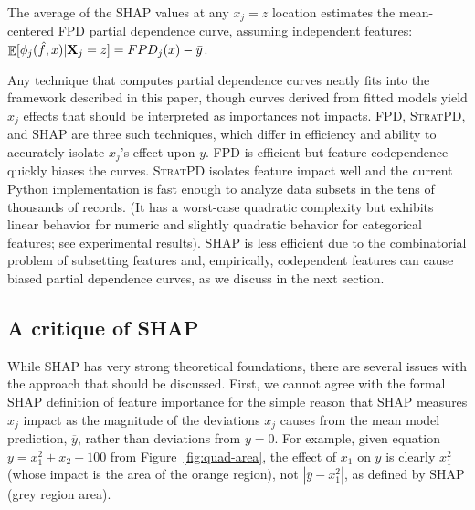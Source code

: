 \documentclass[11pt]{article}
\newcommand{\figref}[1]{Figure~\ref{#1}}
\DeclareMathOperator{\Ex}{\mathbb{E}}
\newcommand{\spd}{\fontfamily{cmr}\textsc{\small StratPD}}
\begin{document}
\begin{theorem}
The average of the SHAP values at any $x_j=z$ location estimates the mean-centered FPD partial dependence curve, assuming independent features: $\Ex[ \phi_j(\hat{f},x) | {\bf X}_j = z] = FPD_j(x) - \bar{y}$.
\end{theorem}

Any technique that computes partial dependence curves neatly fits into the framework described in this paper, though curves derived from fitted models yield $x_j$ effects that should be interpreted as importances not impacts. FPD, \spd{}, and SHAP are three such techniques, which differ in efficiency and ability to accurately isolate $x_j$'s effect upon $y$. FPD is efficient but feature codependence quickly biases the curves. \spd{} isolates feature impact well and the current Python implementation is fast enough to analyze data subsets in the tens of thousands of records. (It has a worst-case quadratic complexity but exhibits linear behavior for numeric and slightly quadratic behavior for categorical features; see experimental results). SHAP is less efficient due to the combinatorial problem of subsetting features and, empirically, codependent features can cause biased partial dependence curves, as we discuss in the next section.

\subsection{A critique of SHAP}

While SHAP has very strong theoretical foundations, there are several issues with the approach that should be discussed.  First, we cannot agree with the formal SHAP definition of feature importance for the simple reason that SHAP measures $x_j$ impact as the magnitude of the deviations $x_j$ causes from the mean model prediction, $\overline{y}$, rather than deviations from $y=0$.   For example, given equation $y=x_1^2 + x_2 + 100$ from \figref{fig:quad-area}, the effect of $x_1$ on $y$ is clearly $x_1^2$ (whose impact is the area of the orange region), not $|\overline{y} - x_1^2|$, as defined by SHAP (grey region area). 
\end{document}
